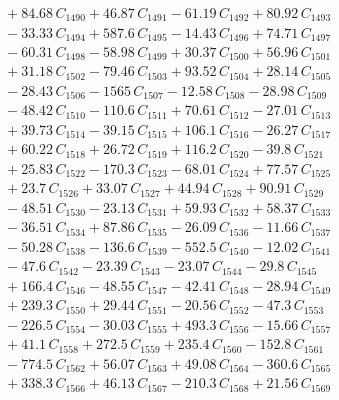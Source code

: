 \documentclass[a4paper,11pt]{article}
\begin{document}
\begin{align}
&\quad + 84.68\,C_{1490} + 46.87\,C_{1491} - 61.19\,C_{1492} + 80.92\,C_{1493} \nonumber\\
&\quad - 33.33\,C_{1494} + 587.6\,C_{1495} - 14.43\,C_{1496} + 74.71\,C_{1497} \nonumber\\
&\quad - 60.31\,C_{1498} - 58.98\,C_{1499} + 30.37\,C_{1500} + 56.96\,C_{1501} \nonumber\\
&\quad + 31.18\,C_{1502} - 79.46\,C_{1503} + 93.52\,C_{1504} + 28.14\,C_{1505} \nonumber\\
&\quad - 28.43\,C_{1506} - 1565\,C_{1507} - 12.58\,C_{1508} - 28.98\,C_{1509} \nonumber\\
&\quad - 48.42\,C_{1510} - 110.6\,C_{1511} + 70.61\,C_{1512} - 27.01\,C_{1513} \nonumber\\
&\quad + 39.73\,C_{1514} - 39.15\,C_{1515} + 106.1\,C_{1516} - 26.27\,C_{1517} \nonumber\\
&\quad + 60.22\,C_{1518} + 26.72\,C_{1519} + 116.2\,C_{1520} - 39.8\,C_{1521} \nonumber\\
&\quad + 25.83\,C_{1522} - 170.3\,C_{1523} - 68.01\,C_{1524} + 77.57\,C_{1525} \nonumber\\
&\quad + 23.7\,C_{1526} + 33.07\,C_{1527} + 44.94\,C_{1528} + 90.91\,C_{1529} \nonumber\\
&\quad - 48.51\,C_{1530} - 23.13\,C_{1531} + 59.93\,C_{1532} + 58.37\,C_{1533} \nonumber\\
&\quad - 36.51\,C_{1534} + 87.86\,C_{1535} - 26.09\,C_{1536} - 11.66\,C_{1537} \nonumber\\
&\quad - 50.28\,C_{1538} - 136.6\,C_{1539} - 552.5\,C_{1540} - 12.02\,C_{1541} \nonumber\\
&\quad - 47.6\,C_{1542} - 23.39\,C_{1543} - 23.07\,C_{1544} - 29.8\,C_{1545} \nonumber\\
&\quad + 166.4\,C_{1546} - 48.55\,C_{1547} - 42.41\,C_{1548} - 28.94\,C_{1549} \nonumber\\
&\quad + 239.3\,C_{1550} + 29.44\,C_{1551} - 20.56\,C_{1552} - 47.3\,C_{1553} \nonumber\\
&\quad - 226.5\,C_{1554} - 30.03\,C_{1555} + 493.3\,C_{1556} - 15.66\,C_{1557} \nonumber\\
&\quad + 41.1\,C_{1558} + 272.5\,C_{1559} + 235.4\,C_{1560} - 152.8\,C_{1561} \nonumber\\
&\quad - 774.5\,C_{1562} + 56.07\,C_{1563} + 49.08\,C_{1564} - 360.6\,C_{1565} \nonumber\\
&\quad + 338.3\,C_{1566} + 46.13\,C_{1567} - 210.3\,C_{1568} + 21.56\,C_{1569} \nonumber\\

\end{align}
\end{document}

